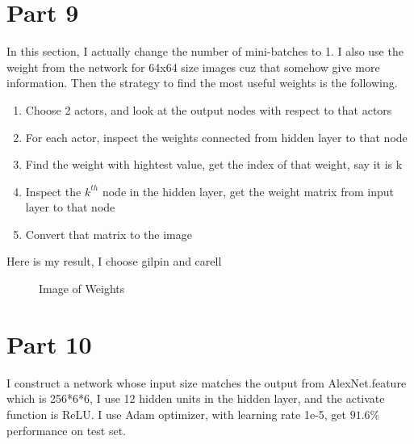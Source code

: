 \documentclass[12pt]{article}
\begin{document}
\section*{Part 9}
In this section, I actually change the number of mini-batches to 1. I also use the weight from the network for 64x64 size images cuz that somehow give more information. Then the strategy to find the most useful weights is the following. 
\begin{enumerate}
    \item Choose 2 actors, and look at the output nodes with respect to that actors
    \item For each actor, inspect the weights connected from hidden layer to that node
    \item Find the weight with hightest value, get the index of that weight, say it is k
    \item Inspect the $k^{th}$ node in the hidden layer, get the weight matrix from input layer to that node
    \item Convert that matrix to the image
\end{enumerate}
Here is my result, I choose gilpin and carell
\begin{figure}[H]
    \qquad
    \caption{Image of Weights}
\end{figure}

\section*{Part 10}
I construct a network whose input size matches the output from AlexNet.feature which is 256*6*6, I use 12 hidden units in the hidden layer, and the activate function is ReLU. I use Adam optimizer, with learning rate 1e-5, get $91.6\%$ performance on test set.
\end{document}
